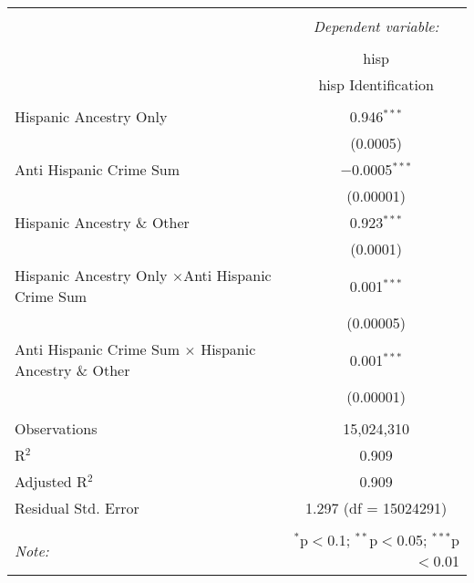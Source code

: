 \documentclass{article}
\begin{document}
    \begin{table}[!htbp] \centering 
      \caption{} 
      \label{} 
    \begin{tabular}{@{\extracolsep{5pt}}lc} 
    \\[-1.8ex]\hline 
    \hline \\[-1.8ex] 
     & \multicolumn{1}{c}{\textit{Dependent variable:}} \\ 
    \cline{2-2} 
    \\[-1.8ex] & hisp \\ 
     & hisp Identification \\ 
    \hline \\[-1.8ex] 
     Hispanic Ancestry Only & 0.946$^{***}$ \\ 
      & (0.0005) \\ 
     Anti Hispanic Crime Sum  & $-$0.0005$^{***}$ \\ 
      & (0.00001) \\ 
     Hispanic Ancestry \& Other & 0.923$^{***}$ \\ 
      & (0.0001) \\ 
     Hispanic Ancestry Only $\times$Anti Hispanic Crime Sum  & 0.001$^{***}$ \\ 
      & (0.00005) \\ 
     Anti Hispanic Crime Sum $\times$ Hispanic Ancestry \& Other & 0.001$^{***}$ \\ 
      & (0.00001) \\ 
    \hline \\[-1.8ex] 
    Observations & 15,024,310 \\ 
    R$^{2}$ & 0.909 \\ 
    Adjusted R$^{2}$ & 0.909 \\ 
    Residual Std. Error & 1.297 (df = 15024291) \\ 
    \hline 
    \hline \\[-1.8ex] 
    \textit{Note:}  & \multicolumn{1}{r}{$^{*}$p$<$0.1; $^{**}$p$<$0.05; $^{***}$p$<$0.01} \\ 
    \end{tabular} 
    \end{table} 

\newpage
\end{document}
